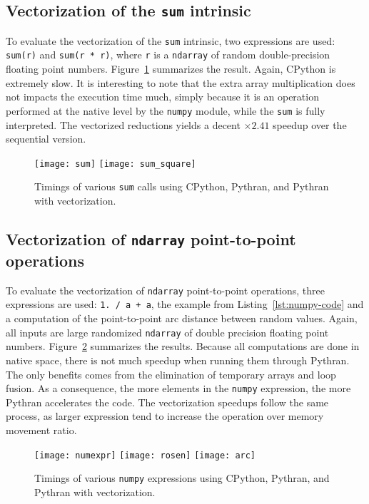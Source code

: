 \documentclass[preprint]{sigplanconf}
\begin{document}
\subsection{Vectorization of the \texttt{sum} intrinsic}

To evaluate the vectorization of the \texttt{sum} intrinsic, two expressions
are used: \texttt{sum(r)} and \texttt{sum(r * r)}, where \texttt{r} is a
\texttt{ndarray} of random double-precision floating point numbers.
Figure~\ref{fig:sum-timings} summarizes the result. Again, CPython is extremely
slow. It is interesting to note that the extra array multiplication does not
impacts the execution time much, simply because it is an operation performed at
the native level by the \texttt{numpy} module, while the \texttt{sum} is fully
interpreted. The vectorized reductions yields a decent $\times2.41$ speedup
over the sequential version.

\begin{figure}[ht]

    \texttt{[image: sum]}
    \texttt{[image: sum\_square]}
    \caption{Timings of various \texttt{sum} calls using CPython, Pythran, and Pythran with vectorization.}
    \label{fig:sum-timings}

\end{figure}

\subsection{Vectorization of \texttt{ndarray} point-to-point operations}
\label{sec:bench-numpy}

To evaluate the vectorization of \texttt{ndarray} point-to-point operations,
three expressions are used: \texttt{1. / a + a}, the example from
Listing~\ref{lst:numpy-code} and a computation of the point-to-point arc
distance  between random values. Again, all inputs are large randomized
\texttt{ndarray} of double precision floating point numbers.
Figure~\ref{fig:numpy-timings} summarizes the results. Because all computations
are done in native space, there is not much speedup when running them through
Pythran. The only benefits comes from the elimination of temporary arrays and
loop fusion. As a consequence, the more elements in the \texttt{numpy}
expression, the more Pythran accelerates the code. The vectorization speedups
follow the same process, as larger expression tend to increase the operation
over memory movement ratio.

\begin{figure}[ht]

    \texttt{[image: numexpr]}
    \texttt{[image: rosen]}
    \texttt{[image: arc]}
    \caption{Timings of various \texttt{numpy} expressions using CPython, Pythran, and Pythran with vectorization.}
    \label{fig:numpy-timings}

\end{figure}
\end{document}
